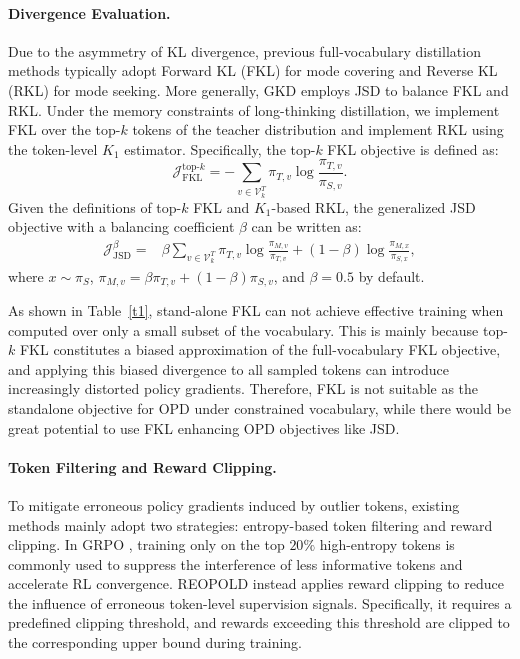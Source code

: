 \documentclass{article} %
\renewcommand{\cite}[1]{\citep{#1}}
\begin{document}
\paragraph{Divergence Evaluation.}
Due to the asymmetry of KL divergence, previous full-vocabulary distillation methods typically adopt Forward KL (FKL) for mode covering and Reverse KL (RKL) for mode seeking. More generally, GKD \cite{agarwal2024onpolicy} employs JSD to balance FKL and RKL. Under the memory constraints of long-thinking distillation, we implement FKL over the top-$k$ tokens of the teacher distribution and implement RKL using the token-level $K_1$ estimator. Specifically, the top-$k$ FKL objective is defined as:
\begin{equation}
    \mathcal{J}_{\mathrm{FKL}}^{\mathrm{top}\text{-}k}
    =
    -\sum_{v \in \mathcal{V}^{T}_{k}}
    \pi_{T,v}
    \log
    \frac{\pi_{T,v}}{\pi_{S,v}} .
\end{equation}
Given the definitions of top-$k$ FKL and $K_1$-based RKL, 
the generalized JSD objective with a balancing coefficient $\beta$ 
can be written as:
\begin{equation}
\begin{aligned}
    \mathcal{J}_{\mathrm{JSD}}^{\beta}
    =
    {}&
    \beta
    \sum_{v \in \mathcal{V}^{T}_{k}}
    \pi_{T,v}
    \log
    \frac{\pi_{M,v}}{\pi_{T,v}}
    +
    (1-\beta)
    \log
    \frac{\pi_{M,x}}{\pi_{S,x}},
\end{aligned}
\end{equation}
where $x \sim \pi_S$, 
$\pi_{M,v} = \beta \pi_{T,v} + (1-\beta)\pi_{S,v}$, 
and $\beta=0.5$ by default.

As shown in Table~\ref{t1}, stand-alone FKL can not achieve effective training when computed over only a small subset of the vocabulary. This is mainly because top-$k$ FKL constitutes a biased approximation of the full-vocabulary FKL objective, and applying this biased divergence to all sampled tokens can introduce increasingly distorted policy gradients. Therefore, FKL is not suitable as the standalone objective for OPD under constrained vocabulary, while there would be great potential to use FKL enhancing OPD objectives like JSD.


\paragraph{Token Filtering and Reward Clipping.}
To mitigate erroneous policy gradients induced by outlier tokens, existing methods mainly adopt two strategies: entropy-based token filtering and reward clipping. In GRPO \cite{shao2024deepseekmath}, training only on the top $20\%$ high-entropy tokens is commonly used to suppress the interference of less informative tokens and accelerate RL convergence. REOPOLD \cite{ko2026scaling} instead applies reward clipping to reduce the influence of erroneous token-level supervision signals. Specifically, it requires a predefined clipping threshold, and rewards exceeding this threshold are clipped to the corresponding upper bound during training.
\end{document}
